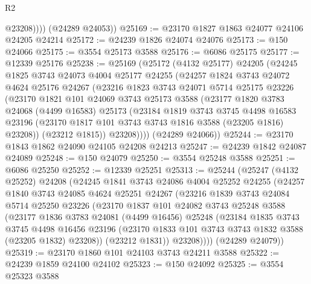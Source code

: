 \begin{lexlean}{R2}
\begin{coremodule}
              @23208))))
      (@24289 @24053))
@25169 := @23170 @1827 @1863 @24077 @24106 @24205 @24214
@25172 := @24239 @1826 @24074 @24076
@25173 := @150 @24066
@25175 := @3554 @25173 @3588
@25176 := @6086 @25175
@25177 := @12339 @25176
@25238 := @25169
    (@25172
      (@4132 @25177)
      @24205
      (@24245
        @1825
        @3743
        @24073
        @4004
        @25177
        @24255
        (@24257
          @1824
          @3743
          @24072
          @4624
          @25176
          @24267
          (@23216
            @1823
            @3743
            @24071
            @5714
            @25175
            @23226
            (@23170
              @1821
              @101
              @24069
              @3743
              @25173
              @3588
              (@23177
                @1820
                @3783
                @24068
                (@4499 @16583)
                @25173
                (@23184
                  @1819
                  @3743
                  @3745
                  @4498
                  @16583
                  @23196
                  (@23170 @1817 @101 @3743 @3743 @1816 @3588 (@23205 @1816) @23208))
                (@23212 @1815))
              @23208))))
      (@24289 @24066))
@25244 := @23170 @1843 @1862 @24090 @24105 @24208 @24213
@25247 := @24239 @1842 @24087 @24089
@25248 := @150 @24079
@25250 := @3554 @25248 @3588
@25251 := @6086 @25250
@25252 := @12339 @25251
@25313 := @25244
    (@25247
      (@4132 @25252)
      @24208
      (@24245
        @1841
        @3743
        @24086
        @4004
        @25252
        @24255
        (@24257
          @1840
          @3743
          @24085
          @4624
          @25251
          @24267
          (@23216
            @1839
            @3743
            @24084
            @5714
            @25250
            @23226
            (@23170
              @1837
              @101
              @24082
              @3743
              @25248
              @3588
              (@23177
                @1836
                @3783
                @24081
                (@4499 @16456)
                @25248
                (@23184
                  @1835
                  @3743
                  @3745
                  @4498
                  @16456
                  @23196
                  (@23170 @1833 @101 @3743 @3743 @1832 @3588 (@23205 @1832) @23208))
                (@23212 @1831))
              @23208))))
      (@24289 @24079))
@25319 := @23170 @1860 @101 @24103 @3743 @24211 @3588
@25322 := @24239 @1859 @24100 @24102
@25323 := @150 @24092
@25325 := @3554 @25323 @3588

\end{coremodule}
\end{lexlean}
